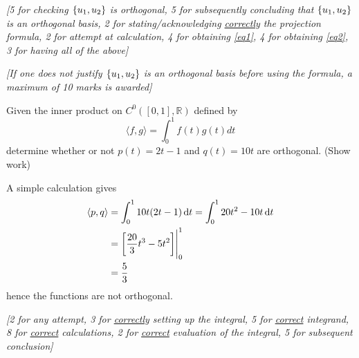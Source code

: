 \documentclass[answers,11pt]{exam}
\theoremstyle{definition}
\DeclareMathOperator{\1}{\mathbbm{1}}
\DeclareMathOperator{\D}{\dif}
\newcommand{\innerproduct}[2]{\left\langle #1,#2 \right\rangle}
\begin{document}
\begin{questions}
\begin{solution}
	\textit{[5 for checking $\set{u_1,u_2}$ is orthogonal, 5 for subsequently concluding that $\set{u_1,u_2}$ is an orthogonal basis, 2 for stating/acknowledging \uline{correctly} the projection formula, 2 for attempt at calculation, 4 for obtaining \eqref{eq1}, 4 for obtaining \eqref{eq2}, 3 for having all of the above]}

	\textit{[If one does not justify $\set{u_1,u_2}$ is an orthogonal basis before using the formula, a maximum of 10 marks is awarded]}
\end{solution}

\question[25] Given the inner product on $C^0([0,1],\mathbb{R})$ defined by 
\begin{equation*}
\langle f,g\rangle =\int_0^1 f(t)g(t)dt
\end{equation*}
determine whether or not $p(t)=2t-1$ and $q(t)=10t$ are orthogonal. (Show work)

\begin{solution}
	A simple calculation gives
	\begin{align*}
		\innerproduct{p}{q} &= \int_{0}^{1} 10t(2t - 1) \D t = \int_{0}^{1} 20t^2 - 10t \D t \\
		&= \eval{\left[ \frac{20}{3} t^3 - 5t^2 \right]}_{0}^{1} \\
		&= \frac{5}{3}
	\end{align*}
	hence the functions are not orthogonal.
	
	\textit{[2 for any attempt, 3 for \uline{correctly} setting up the integral, 5 for \uline{correct} integrand, 8 for \uline{correct} calculations, 2 for \uline{correct} evaluation of the integral, 5 for subsequent conclusion]}
\end{solution}


\end{questions}
\end{document}
